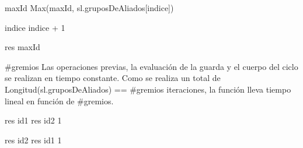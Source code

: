 {
	\state {} 									

	\state
	\state {} 								
					
		\state
		
		\state maxId \asig Max(maxId, sl.gruposDeAliados[indice])	

		\state
		\state indice \asig indice + 1								
	\endwhile
	\state

	\state res \asig maxId											
}
{ \#gremios }
{ Las operaciones previas, la evaluaci\'on de la guarda y el cuerpo del ciclo se realizan en tiempo constante. Como se realiza un total de Longitud(sl.gruposDeAliados) == \#gremios iteraciones, la funci\'on lleva tiempo lineal en funci\'on de \#gremios. }

{
						
		\state res \asig id1			
	\Else
		\state res \asig id2			
	\endif
}
{1}
{}

{
						
		\state res \asig id2			
	\Else
		\state res \asig id1			
	\endif
}
{1}
{}